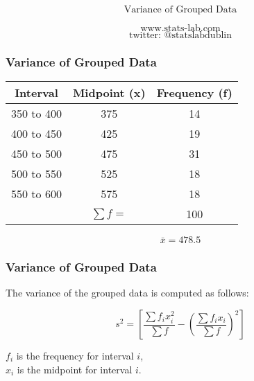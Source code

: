 \documentclass{beamer}
\begin{document}
\begin{frame}

{
\Huge
\[\mbox{Variance of Grouped Data} \]
}
{
\Large

\[\mbox{www.stats-lab.com} \]
\[ \mbox{twitter: @statslabdublin} \] 

}
\end{frame}
\begin{frame}
\frametitle{Variance of Grouped Data}
{
\begin{center}
\Large

\begin{tabular}{|c|c|c|}
\hline Interval & Midpoint (x) & Frequency (f) \\ 
\hline \hline 350 to 400 & 375 & 14 \\ 
\hline 400 to 450 & 425  & 19 \\ 
\hline 450 to 500 & 475 & 31 \\ 
\hline 500 to 550 & 525 & 18 \\ 
\hline 550 to 600 & 575 &  18\\ \hline
\hline  &  $\sum f = $& 100  \\ 
\hline 
\end{tabular} 

\[ \bar{x} = 478.5 \]
\end{center}

}

\end{frame}
\begin{frame}
\frametitle{Variance of Grouped Data}
{
\LARGE
The variance of the grouped data is computed as follows:

\[ s^2 = \left[ \frac{\sum f_ix_i^2}{\sum f} - \left(\frac{\sum f_ix_i}{\sum f}\right)^2 \right] \]
\bigskip

$f_i$ is the frequency for interval $i$,\\
$x_i$ is the midpoint for interval $i$.

}

\end{frame}
\end{document}
